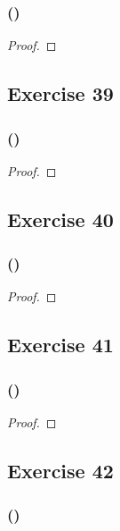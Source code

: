 \documentclass[14pt]{extarticle}
\begin{document}
\subsubsection{()}

\begin{proof}

\end{proof}

\subsection{Exercise 39}

\subsubsection{()}

\begin{proof}

\end{proof}

\subsection{Exercise 40}

\subsubsection{()}

\begin{proof}

\end{proof}

\subsection{Exercise 41}

\subsubsection{()}

\begin{proof}

\end{proof}

\subsection{Exercise 42}

\subsubsection{()}
\end{document}
